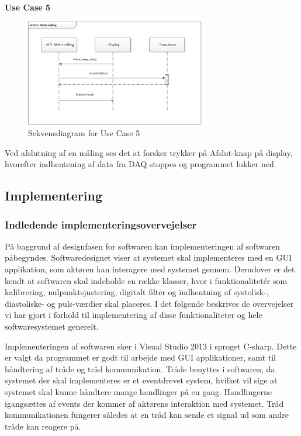 \textbf{Use Case 5}
\begin{figure}[H]
	\centering
	\includegraphics[width=0.7\textwidth]{Figurer/UC5}
	\caption{Sekvensdiagram for Use Case 5}
\end{figure}
Ved afslutning af en måling ses det at forsker trykker på Afslut-knap på display, hvorefter indhentening af data fra DAQ stoppes og programmet lukker ned.

\subsection{Implementering}
\subsubsection{Indledende implementeringsovervejelser}
På baggrund af designfasen for softwaren kan implementeringen af softwaren påbegyndes. Softwaredesignet viser at systemet skal implementeres med en GUI applikation, som aktøren kan interagere med systemet gennem. Derudover er det kendt at softwaren skal indeholde en række klasser, hvor i funktionalitetér som kalibrering, nulpunktsjustering, digitalt filter og indhentning af systolisk-, diastoliske- og puls-værdier skal placeres. I det følgende beskrives de overvejelser vi har gjort i forhold til implementering af disse funktionaliteter og hele softwaresystemet generelt. 

Implementeringen af softwaren sker i Visual Studio 2013 i sproget C-sharp. Dette er valgt da programmet er godt til arbejde med GUI applikationer, samt til håndtering af tråde og tråd kommunikation. Tråde benyttes i softwaren, da systemet der skal implementeres er et eventdrevet system, hvilket vil sige at systemet skal kunne håndtere mange handlinger på en gang. Handlingerne igangsættes af events der kommer af aktørens interaktion med systemet. Tråd kommunikationen fungerer således at en tråd kan sende et signal ud som andre tråde kan reagere på. 

